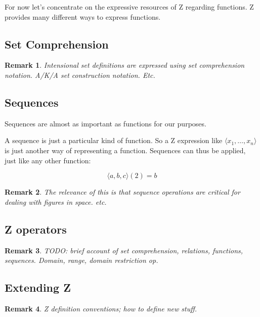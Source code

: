 \documentclass[12pt]{tufte-handout}
\numberwithin{equation}{subsection}
\numberwithin{equation}{subsection}
\newtheorem{remark}{Remark}
\begin{document}
For now let's concentrate on the expressive resources of Z regarding
functions.  Z provides many different ways to express functions.

\subsection{Set Comprehension}
\label{subs:setcomp}

\begin{remark}
  Intensional set definitions are expressed using set comprehension
  notation. A/K/A set construction notation.  Etc.
\end{remark}

\subsection{Sequences}
\label{sect:seqs}

Sequences are almost as important as functions for our purposes.

A sequence is just a particular kind of function.  So a Z expression
like \(\langle x_1,\ldots,x_n\rangle\) is just another way of
representing a function.  Sequences can thus be applied, just like
any other function:

\[\langle a,b,c\rangle(2) = b\]

\begin{remark}
  The relevance of this is that sequence operations are critical for dealing with figures in space. etc.
\end{remark}

\subsection{Z operators}
\label{subs:zops}

\begin{remark}
  TODO: brief account of set comprehension, relations, functions,
  sequences.  Domain, range, domain restriction op.
\end{remark}

\subsection{Extending Z}
\label{sect:zdefns}

\begin{remark}
  Z definition conventions; how to define new stuff.
\end{remark}
\end{document}
